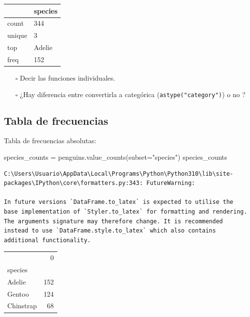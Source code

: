 \documentclass[
  a4paper,
  noprof,
  12pt,
  notoc,
  nosols,
  nobib]{mnye}
\newenvironment{Shaded}{\begin{snugshade}}{\end{snugshade}}
\newcommand{\NormalTok}[1]{\textcolor[rgb]{0.00,0.23,0.31}{#1}}
\newcommand{\OperatorTok}[1]{\textcolor[rgb]{0.37,0.37,0.37}{#1}}
\newcommand{\StringTok}[1]{\textcolor[rgb]{0.13,0.47,0.30}{#1}}
\theoremstyle{definition}
\theoremstyle{remark}
\begin{document}
\begin{tabular}{ll}
\toprule
{} & species \\
\midrule
count  &     344 \\
unique &       3 \\
top    &  Adelie \\
freq   &     152 \\
\bottomrule
\end{tabular}

\begin{itemize}
\item[$\square$]
  Decir las funciones individuales.
\item[$\square$]
  ¿Hay diferencia entre convertirla a categórica
  (\texttt{astype("category")}) o no ?
\end{itemize}

\hypertarget{tabla-de-frecuencias}{%
\subsection{Tabla de frecuencias}\label{tabla-de-frecuencias}}

Tabla de frecuencias absolutas:

\begin{Shaded}
\begin{Highlighting}[]
\NormalTok{species\_counts }\OperatorTok{=}\NormalTok{ penguins.value\_counts(subset}\OperatorTok{=}\StringTok{"species"}\NormalTok{)}
\NormalTok{species\_counts}
\end{Highlighting}
\end{Shaded}

\begin{verbatim}
C:\Users\Usuario\AppData\Local\Programs\Python\Python310\lib\site-packages\IPython\core\formatters.py:343: FutureWarning:

In future versions `DataFrame.to_latex` is expected to utilise the base implementation of `Styler.to_latex` for formatting and rendering. The arguments signature may therefore change. It is recommended instead to use `DataFrame.style.to_latex` which also contains additional functionality.
\end{verbatim}

\begin{tabular}{lr}
\toprule
{} &    0 \\
species   &      \\
\midrule
Adelie    &  152 \\
Gentoo    &  124 \\
Chinstrap &   68 \\
\bottomrule
\end{tabular}
\end{document}
